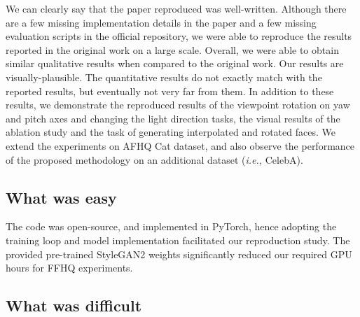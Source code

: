 We can clearly say that the paper reproduced was well-written. Although there are a few missing implementation details in the paper and a few missing evaluation scripts in the official repository, we were able to reproduce the results reported in the original work on a large scale. 
Overall, we were able to obtain similar qualitative results when compared to the original work. Our results are visually-plausible. The quantitative results do not exactly match with the reported results, but eventually not very far from them. In addition to these results, we demonstrate the reproduced results of the viewpoint rotation on yaw and pitch axes and changing the light direction tasks, the visual results of the ablation study and the task of generating interpolated and rotated faces. We extend the experiments on AFHQ Cat dataset, and also observe the performance of the proposed methodology on an additional dataset (\textit{i.e.,} CelebA).


\subsection{What was easy}
The code was open-source, and implemented in PyTorch, hence adopting the training loop and model implementation facilitated our reproduction study. The provided pre-trained StyleGAN2 weights significantly reduced our required GPU hours for FFHQ experiments.

\subsection{What was difficult}

